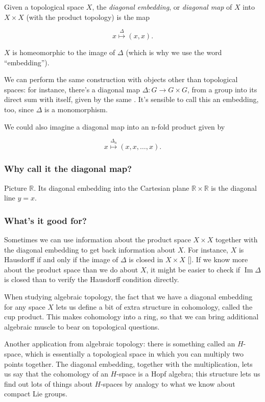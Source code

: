 \documentclass[12pt]{article}
\begin{document}

Given a topological space $X$, the \emph{diagonal embedding}, or \emph{diagonal map} of $X$ into $X\times X$ (with the product topology) is the map

\[x\stackrel{\Delta}{\longmapsto}(x,x) .\]

$X$ is homeomorphic to the image of $\Delta$ (which is why we use the word ``embedding{}'').


We can perform the same construction with objects other than topological spaces: for instance, there's a diagonal map $\Delta\colon G\to G\times G$, from a group into its direct sum with itself, given by the same .  It's sensible to call this an embedding, too, since $\Delta$ is a monomorphism.

We could also imagine a diagonal map into an n-fold product given by

\[x\stackrel{\Delta_n}{\longmapsto}(x,x,\ldots ,x).\]

\subsubsection*{Why call it the diagonal map?}

Picture $\mathbb{R}$.  Its diagonal embedding into the Cartesian plane $\mathbb{R}\times\mathbb{R}$ is the diagonal line $y=x$.

\subsubsection*{What's it good for?}

Sometimes we can use information about the product space $X\times X$ together with the diagonal embedding to get back information about $X$.  For instance, $X$ is Hausdorff if and only if the image of $\Delta$ is closed in $X\times X$ [].  If we know more about the product space than we do about $X$, it might be easier to check if $\operatorname{Im}\Delta$ is closed than to verify the Hausdorff condition directly.

When studying algebraic topology, the fact that we have a diagonal embedding for any space $X$ lets us define a bit of extra structure in cohomology, called the cup product.  This makes cohomology into a ring, so that we can bring additional algebraic muscle to bear on topological questions.

Another application from algebraic topology: there is something called an $H$-space, which is essentially a topological space in which you can multiply two points together.  The diagonal embedding, together with the multiplication, lets us say that the cohomology of an $H$-space is a Hopf algebra; this structure lets us find out lots of things about $H$-spaces by analogy to what we know about compact Lie groups.
\end{document}
